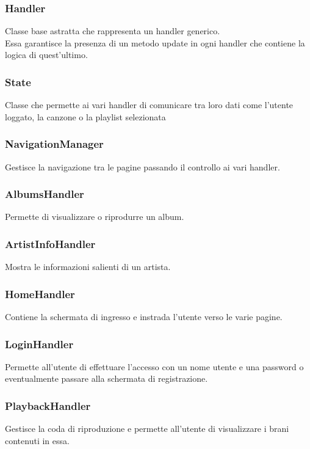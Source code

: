 \documentclass{article}
\begin{document}
  \subsubsection{Handler}
  Classe base astratta che rappresenta un handler generico.\\
  Essa garantisce la presenza di un metodo update in ogni handler che contiene la logica di quest'ultimo.

  \subsubsection{State}
  Classe che permette ai vari handler di comunicare tra loro dati come
  l'utente loggato, la canzone o la playlist selezionata

  \subsubsection{NavigationManager}
  Gestisce la navigazione tra le pagine passando il controllo ai vari handler.

  \subsubsection{AlbumsHandler}
  Permette di visualizzare o riprodurre un album.

  \subsubsection{ArtistInfoHandler}
  Mostra le informazioni salienti di un artista.

  \subsubsection{HomeHandler}
  Contiene la schermata di ingresso e instrada l'utente verso le varie pagine.

  \subsubsection{LoginHandler}
  Permette all'utente di effettuare l'accesso con un nome utente e una password o
  eventualmente passare alla schermata di registrazione.

  \subsubsection{PlaybackHandler}
  Gestisce la coda di riproduzione e permette all'utente di visualizzare i
  brani contenuti in essa.
\end{document}
